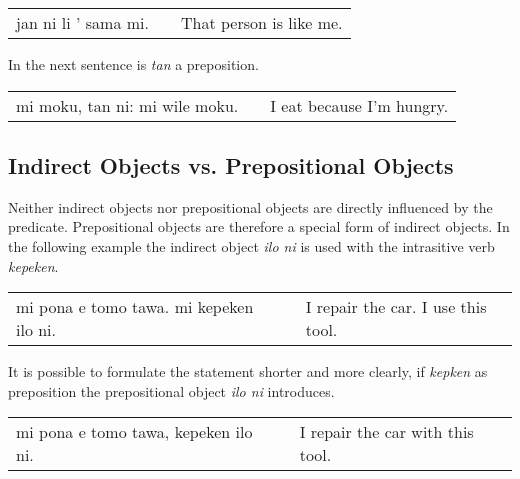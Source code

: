 \begin{supertabular}{p{5,5cm}|ll}
jan ni li ' sama mi. && That person is like me. \\
\end{supertabular} 

%

In the next sentence is \textit{tan} a preposition. 

\begin{supertabular}{p{5,5cm}|ll}
mi moku, tan ni: mi wile moku. &&  I eat because I'm hungry. \\
\end{supertabular} 

%
\subsection*{Indirect Objects vs. Prepositional Objects}
%
%

Neither indirect objects nor prepositional objects are directly influenced by the predicate. 
Prepositional objects are therefore a special form of indirect objects. 
In the following example the indirect object \textit{ilo ni} is used with the intrasitive verb \textit{kepeken}.

\begin{supertabular}{p{5,5cm}|ll}
mi pona e tomo tawa. mi kepeken ilo ni. && I repair the car. I use this tool. \\
\end{supertabular} 

It is possible to formulate the statement shorter and more clearly, if \textit{kepken} as preposition the prepositional object \textit{ilo ni} introduces. 

\begin{supertabular}{p{5,5cm}|ll}
mi pona e tomo tawa, kepeken ilo ni. && I repair the car with this tool. \\
\end{supertabular} 

